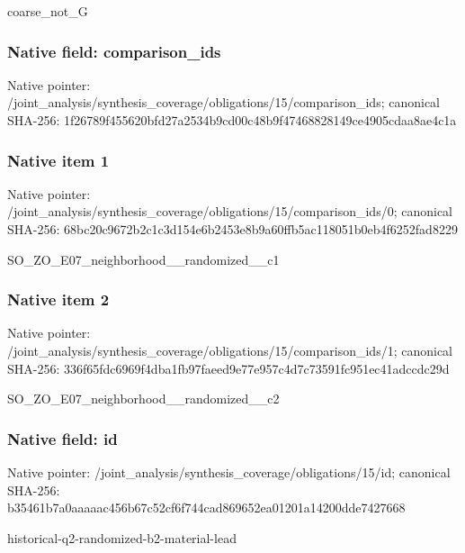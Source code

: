 \documentclass[10pt,a4paper]{article}
\begin{document}
\begingroup\raggedright\sloppy coarse\_\allowbreak{}not\_\allowbreak{}G\par\endgroup

\subsubsection{Native field: comparison\_\allowbreak{}ids}
Native pointer: /joint\_\allowbreak{}analysis/synthesis\_\allowbreak{}coverage/obligations/15/comparison\_\allowbreak{}ids; canonical SHA-256: 1f26789f455620bfd27a2534b9cd00c48b9f47468828149ce4905cdaa8ae4c1a

\subsubsection{Native item 1}
Native pointer: /joint\_\allowbreak{}analysis/synthesis\_\allowbreak{}coverage/obligations/15/comparison\_\allowbreak{}ids/0; canonical SHA-256: 68bc20c9672b2c1c3d154e6b2453e8b9a60ffb5ac118051b0eb4f6252fad8229

\begingroup\raggedright\sloppy SO\_\allowbreak{}ZO\_\allowbreak{}E07\_\allowbreak{}neighborhood\_\allowbreak{}\_\allowbreak{}randomized\_\allowbreak{}\_\allowbreak{}c1\par\endgroup

\subsubsection{Native item 2}
Native pointer: /joint\_\allowbreak{}analysis/synthesis\_\allowbreak{}coverage/obligations/15/comparison\_\allowbreak{}ids/1; canonical SHA-256: 336f65fdc6969f4dba1fb97faeed9e77e957c4d7c73591fc951ec41adccdc29d

\begingroup\raggedright\sloppy SO\_\allowbreak{}ZO\_\allowbreak{}E07\_\allowbreak{}neighborhood\_\allowbreak{}\_\allowbreak{}randomized\_\allowbreak{}\_\allowbreak{}c2\par\endgroup

\subsubsection{Native field: id}
Native pointer: /joint\_\allowbreak{}analysis/synthesis\_\allowbreak{}coverage/obligations/15/id; canonical SHA-256: b35461b7a0aaaaac456b67c52cf6f744cad869652ea01201a14200dde7427668

\begingroup\raggedright\sloppy historical-q2-randomized-b2-material-lead\par\endgroup
\end{document}
